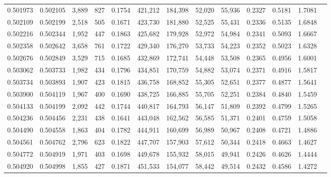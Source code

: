 \begin{tabular}{rrrrrrrrrrrrr}
0.501973 & 0.502105 & 3,889 &   827 &                                     0.1754 & 421,212 & 184,398 &  52,020 &  55,936 & 0.2327 & 0.5181 & 1.7081 \\
0.502109 & 0.502199 & 2,518 &   505 &                                     0.1671 & 423,730 & 181,880 &  52,525 &  55,431 & 0.2336 & 0.5135 & 1.6848 \\
0.502216 & 0.502344 & 1,952 &   447 &                                     0.1863 & 425,682 & 179,928 &  52,972 &  54,984 & 0.2341 & 0.5093 & 1.6667 \\
0.502358 & 0.502642 & 3,658 &   761 &                                     0.1722 & 429,340 & 176,270 &  53,733 &  54,223 & 0.2352 & 0.5023 & 1.6328 \\
0.502676 & 0.502849 & 3,529 &   715 &                                     0.1685 & 432,869 & 172,741 &  54,448 &  53,508 & 0.2365 & 0.4956 & 1.6001 \\
0.503062 & 0.503733 & 1,982 &   434 &                                     0.1796 & 434,851 & 170,759 &  54,882 &  53,074 & 0.2371 & 0.4916 & 1.5817 \\
0.503734 & 0.503893 & 1,907 &   423 &                                     0.1815 & 436,758 & 168,852 &  55,305 &  52,651 & 0.2377 & 0.4877 & 1.5641 \\
0.503900 & 0.504119 & 1,967 &   400 &                                     0.1690 & 438,725 & 166,885 &  55,705 &  52,251 & 0.2384 & 0.4840 & 1.5459 \\
0.504133 & 0.504199 & 2,092 &   442 &                                     0.1744 & 440,817 & 164,793 &  56,147 &  51,809 & 0.2392 & 0.4799 & 1.5265 \\
0.504236 & 0.504456 & 2,231 &   438 &                                     0.1641 & 443,048 & 162,562 &  56,585 &  51,371 & 0.2401 & 0.4759 & 1.5058 \\
0.504490 & 0.504558 & 1,863 &   404 &                                     0.1782 & 444,911 & 160,699 &  56,989 &  50,967 & 0.2408 & 0.4721 & 1.4886 \\
0.504561 & 0.504762 & 2,796 &   623 &                                     0.1822 & 447,707 & 157,903 &  57,612 &  50,344 & 0.2418 & 0.4663 & 1.4627 \\
0.504772 & 0.504919 & 1,971 &   403 &                                     0.1698 & 449,678 & 155,932 &  58,015 &  49,941 & 0.2426 & 0.4626 & 1.4444 \\
0.504920 & 0.504998 & 1,855 &   427 &                                     0.1871 & 451,533 & 154,077 &  58,442 &  49,514 & 0.2432 & 0.4586 & 1.4272 \\

\end{tabular}

